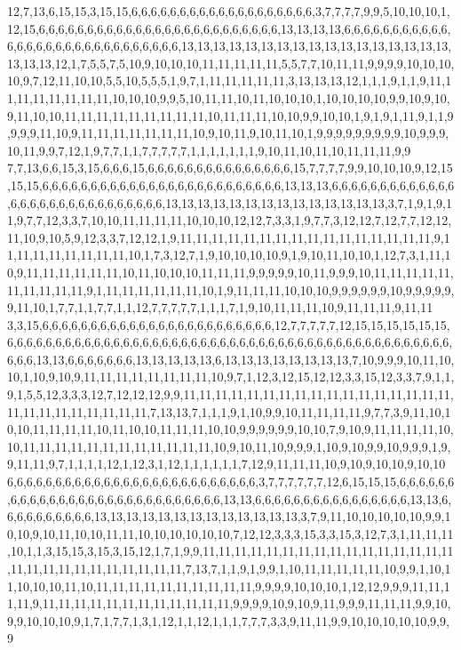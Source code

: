 12,7,13,6,15,15,3,15,15,6,6,6,6,6,6,6,6,6,6,6,6,6,6,6,6,6,6,6,3,7,7,7,7,9,9,5,10,10,10,1,12,15,6,6,6,6,6,6,6,6,6,6,6,6,6,6,6,6,6,6,6,6,6,6,6,6,6,13,13,13,13,6,6,6,6,6,6,6,6,6,6,6,6,6,6,6,6,6,6,6,6,6,6,6,6,6,6,6,6,6,13,13,13,13,13,13,13,13,13,13,13,13,13,13,13,13,13,13,13,13,12,1,7,5,5,7,5,10,9,10,10,10,11,11,11,11,11,5,5,7,7,10,11,11,9,9,9,9,10,10,10,10,9,7,12,11,10,10,5,5,10,5,5,5,1,9,7,1,11,11,11,11,11,3,13,13,13,12,1,1,1,9,1,1,9,11,11,11,11,11,11,11,11,10,10,10,9,9,5,10,11,11,10,11,10,10,10,1,10,10,10,10,9,9,10,9,10,9,11,10,10,11,11,11,11,11,11,11,11,11,10,11,11,11,10,10,9,9,10,10,1,9,1,9,1,11,9,1,1,9,9,9,9,11,10,9,11,11,11,11,11,11,11,10,9,10,11,9,10,11,10,1,9,9,9,9,9,9,9,9,9,10,9,9,9,10,11,9,9,7,12,1,9,7,7,1,1,7,7,7,7,7,1,1,1,1,1,1,1,9,10,11,10,11,10,11,11,11,9,9
7,7,13,6,6,15,3,15,6,6,6,15,6,6,6,6,6,6,6,6,6,6,6,6,6,6,6,15,7,7,7,7,9,9,10,10,10,9,12,15,15,15,6,6,6,6,6,6,6,6,6,6,6,6,6,6,6,6,6,6,6,6,6,6,6,6,6,13,13,13,6,6,6,6,6,6,6,6,6,6,6,6,6,6,6,6,6,6,6,6,6,6,6,6,6,6,6,6,6,13,13,13,13,13,13,13,13,13,13,13,13,13,13,3,7,1,9,1,9,11,9,7,7,12,3,3,7,10,10,11,11,11,11,10,10,10,12,12,7,3,3,1,9,7,7,3,12,12,7,12,7,7,12,12,11,10,9,10,5,9,12,3,3,7,12,12,1,9,11,11,11,11,11,11,11,11,11,11,11,11,11,11,11,11,9,11,11,11,11,11,11,11,11,10,1,7,3,12,7,1,9,10,10,10,10,9,1,9,10,11,10,10,1,12,7,3,1,11,10,9,11,11,11,11,11,11,10,11,10,10,10,11,11,11,9,9,9,9,9,10,11,9,9,9,10,11,11,11,11,11,11,11,11,11,11,9,1,11,11,11,11,11,11,10,1,9,11,11,11,10,10,10,9,9,9,9,9,9,10,9,9,9,9,9,9,11,10,1,7,7,1,1,7,7,1,1,12,7,7,7,7,7,1,1,1,7,1,9,10,11,11,11,10,9,11,11,11,9,11,11
3,3,15,6,6,6,6,6,6,6,6,6,6,6,6,6,6,6,6,6,6,6,6,6,6,6,6,12,7,7,7,7,7,12,15,15,15,15,15,15,6,6,6,6,6,6,6,6,6,6,6,6,6,6,6,6,6,6,6,6,6,6,6,6,6,6,6,6,6,6,6,6,6,6,6,6,6,6,6,6,6,6,6,6,6,6,6,6,6,13,13,6,6,6,6,6,6,6,13,13,13,13,13,6,13,13,13,13,13,13,13,13,7,10,9,9,9,10,11,10,10,1,10,9,10,9,11,11,11,11,11,11,11,11,10,9,7,1,12,3,12,15,12,12,3,3,15,12,3,3,7,9,1,1,9,1,5,5,12,3,3,3,12,7,12,12,12,9,9,11,11,11,11,11,11,11,11,11,11,11,11,11,11,11,11,11,11,11,11,11,11,11,11,11,11,7,13,13,7,1,1,1,9,1,10,9,9,10,11,11,11,11,9,7,7,3,9,11,10,10,10,11,11,11,11,10,11,10,10,11,11,11,10,10,9,9,9,9,9,9,10,10,7,9,10,9,11,11,11,11,10,10,11,11,11,11,11,11,11,11,11,11,11,11,10,9,10,11,10,9,9,9,1,10,9,10,9,9,10,9,9,9,1,9,9,11,11,9,7,1,1,1,1,12,1,12,3,1,12,1,1,1,1,1,1,7,12,9,11,11,11,10,9,10,9,10,10,9,10,10
6,6,6,6,6,6,6,6,6,6,6,6,6,6,6,6,6,6,6,6,6,6,6,6,6,6,3,7,7,7,7,7,7,12,6,15,15,15,6,6,6,6,6,6,6,6,6,6,6,6,6,6,6,6,6,6,6,6,6,6,6,6,6,6,6,6,13,13,6,6,6,6,6,6,6,6,6,6,6,6,6,6,6,6,13,13,6,6,6,6,6,6,6,6,6,6,13,13,13,13,13,13,13,13,13,13,13,13,13,3,7,9,11,10,10,10,10,10,9,9,10,10,9,10,11,10,10,11,11,10,10,10,10,10,10,7,12,12,3,3,3,15,3,3,15,3,12,7,3,1,11,11,11,10,1,1,3,15,15,3,15,3,15,12,1,7,1,9,9,11,11,11,11,11,11,11,11,11,11,11,11,11,11,11,11,11,11,11,11,11,11,11,11,11,11,11,7,13,7,1,1,9,1,9,9,1,10,11,11,11,11,11,10,9,9,1,10,11,10,10,10,11,10,11,11,11,11,11,11,11,11,11,11,9,9,9,9,10,10,10,1,12,12,9,9,9,11,11,11,11,9,11,11,11,11,11,11,11,11,11,11,11,11,9,9,9,9,10,9,10,9,11,9,9,9,11,11,11,9,9,10,9,9,10,10,10,9,1,7,1,7,7,1,3,1,12,1,1,12,1,1,1,7,7,7,3,3,9,11,11,9,9,10,10,10,10,10,9,9,9

